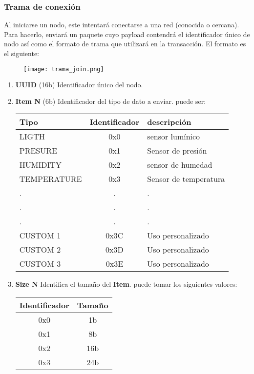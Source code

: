\subsubsection{Trama de conexión}

	Al iniciarse un nodo, este intentará conectarse a una red (conocida o cercana). Para  hacerlo, enviará un paquete cuyo payload contendrá el identificador único de nodo así como el formato de trama que utilizará en la transacción. El formato es el siguiente:
	
	\begin{figure}[!h]
		\texttt{[image: trama\_join.png]}
		\centering
	\end{figure}

	\begin{enumerate}
		\item \textbf{UUID } (16b) Identificador único del nodo.
	 	\item \textbf{Item N} (6b) Identificador del tipo de dato a enviar. puede ser:
		
		\begin{center}
			\begin{tabular}{|l c l|}
				\hline
				Tipo & Identificador & descripción \\
				\hline \hline
				LIGTH 		& 0x0 & sensor lumínico \\
				PRESURE 	& 0x1 & Sensor de presión \\
				HUMIDITY 	& 0x2 & sensor de humedad \\
				TEMPERATURE	& 0x3 & Sensor de temperatura \\
				.			& . & . \\
				.			& . & . \\
				.			& . & . \\
				CUSTOM 1	& 0x3C & Uso personalizado \\
				CUSTOM 2	& 0x3D & Uso personalizado \\
				CUSTOM 3	& 0x3E & Uso personalizado \\
				\hline
			
			\end{tabular}
		\end{center}
	
		\item \textbf{Size N} Identifica el tamaño del \textbf{Item}. puede tomar los siguientes valores:
		
		\begin{center}
			\begin{tabular}{|c c|}
			\hline
			Identificador & Tamaño \\
			\hline \hline
			0x0	&	1b \\
			0x1 &	8b \\
			0x2	&	16b \\
			0x3 &	24b\\
			\hline
			\end{tabular}
		\end{center}
	\end{enumerate}
	
